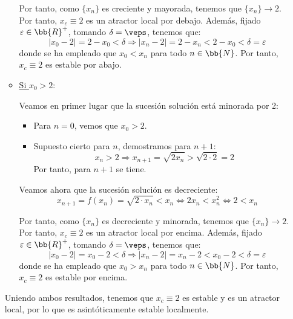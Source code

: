 \begin{ejercicio}
\begin{enumerate}
\begin{itemize}
           Por tanto, como $\{x_n\}$ es creciente y mayorada, tenemos que $\{x_n\}\to 2$. Por tanto, $x_c\equiv 2$ es un atractor local por debajo. Además, fijado $\varepsilon\in \bb{R}^+$, tomando $\delta=\veps$, tenemos que:
           \begin{equation*}
                | x_0 - 2 | = 2 - x_0 < \delta \Longrightarrow | x_n - 2 | = 2 - x_n < 2 - x_0 < \delta = \varepsilon
            \end{equation*}
            donde se ha empleado que $x_0<x_n$ para todo $n\in \bb{N}$. Por tanto, $x_c\equiv 2$ es estable por abajo.



            \item \ul{Si $x_0>2$}:
           
           Veamos en primer lugar que la sucesión solución está minorada por 2:
           \begin{itemize}
               \item Para $n=0$, vemos que $x_0>2$.
               \item Supuesto cierto para $n$, demostramos para $n+1$:
               \begin{equation*}
                   x_n > 2 \Longrightarrow x_{n+1} = \sqrt{2x_n} > \sqrt{2\cdot 2} = 2
               \end{equation*}
               Por tanto, para $n+1$ se tiene.
           \end{itemize}

           Veamos ahora que la sucesión solución es decreciente:
           \begin{equation*}
                x_{n+1} = f(x_n) = \sqrt{2\cdot x_n} < x_n\Longleftrightarrow
                2x_n<x_n^2 \Longleftrightarrow 
                2 < x_n
            \end{equation*}
            
           Por tanto, como $\{x_n\}$ es decreciente y minorada, tenemos que $\{x_n\}\to 2$. Por tanto, $x_c\equiv 2$ es un atractor local por encima. Además, fijado $\varepsilon\in \bb{R}^+$, tomando $\delta=\veps$, tenemos que:
           \begin{equation*}
                | x_0 - 2 | = x_0-2 < \delta \Longrightarrow | x_n - 2 | = x_n-2 < x_0-2 < \delta = \varepsilon
            \end{equation*}
            donde se ha empleado que $x_0>x_n$ para todo $n\in \bb{N}$. Por tanto, $x_c\equiv 2$ es estable por encima.
       \end{itemize} 
       Uniendo ambos resultados, tenemos que $x_c\equiv 2$ es estable y es un atractor local, por lo que es asintóticamente estable localmente.
        

\end{enumerate}
\end{ejercicio}
